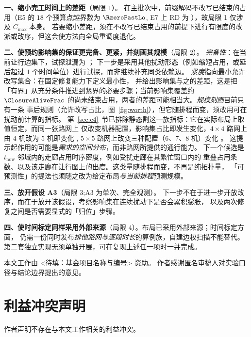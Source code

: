 \textbf{一、缩小完工时间上的差距}（局限 \(1\)）。
在主批次中，前缀解码不改写已结束的占用（E5 的 \(18\) 个预算点越界数为 \(\RzeroPastLo\),
E7 上 RD 为 \RedecodeBad），故局限 1 仅涉及 \(C_{\max}\) 本身。
若要缩小差距，须在不改写已结束占用的前提下进行有限度的改派或改序，但这会使方法向全局重调度退化。

\textbf{二、使预约影响集的保证更完备、更紧，并刻画其规模}（局限 \(2\)）。
\emph{完备性}：在当前让行边集下，试探泄漏为 \ProbeLeaks；
下一步是采用其他扰动形态（例如缩短占用，或延后超过 \(1\) 个时间单位）进行试探，而非继续补充同类依赖边。
\emph{紧度}指向最小允许改写集合：在固定修复能力下定义最小性，
并给出影响集与之的差距，这是把「有界」从充分条件推进到紧界的必要步骤；当前影响集覆盖约
\(\ClosureAliveFrac\) 的尚未结束占用，两者的差距可能相当大。\emph{规模刻画}目前只有一条
事后规则（允许改写占比，图~\ref{fig:worth}），但它随排程而变，须改用可在扰动前计算的指标。
第~\ref{sec:e4}~节已排除静态割这一族指标：它在实际布局上取值恒定，而同一张路网上
仅改变机器配置，影响集占比即发生变化，\(4\times 4\) 路网上由 \(4\) 机改为 \(5\) 机即变化 \PubCloSpread,
\(5\times 5\) 路网上改变三种配置（\(6\)、\(7\)、\(8\) 机）变化 \PubCloSpreadBig。
这提示起作用的可能是\emph{需求的空间分布}，而非路网所提供的通行能力。
下一个候选是 \(t_{\mathrm{now}}\) 邻域内的走廊占用时序密度，例如受扰走廊在其繁忙窗口内的
重叠占用条数、以及该走廊在让行图上的出度。这类量随排程而变，不再是纯拓扑量，
「可预测性」的提法也须随之改为给定布局\emph{与当前排程}预测规模。

\textbf{三、放开假设 A3}（局限 \(3\);A3 为单次、完全观测）。
下一步不在于进一步开放改序，而在于放开该假设，考察影响集在连续扰动下是否会累积膨胀，
以及两次修复之间是否需要显式的「归位」步骤。

\textbf{四、使时间标定同样采用外部来源}（局限 \(4\)）。布局已采用外部来源；时间标定方面，
仍需一份同时发布\emph{排他路网与逐段时长}的算例族，自建边权扫描不能替代。
第二套独立实现无须单独开展，可在复现上述任一项时一并完成。

\begin{acks}
本文工作由 <待填：基金项目名称与编号> 资助。
作者感谢匿名审稿人对实验口径与结论边界提出的意见。
\end{acks}

\section*{利益冲突声明}
作者声明不存在与本文工作相关的利益冲突。





